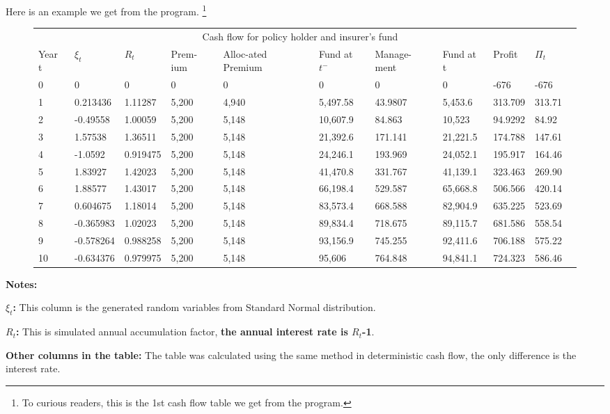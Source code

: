 \documentclass{report}
\begin{document}
Here is an example we get from the program. \footnote{To curious readers, this is the 1st cash flow table we get from the program.}


\begin{figure}[H]
\begin{tabular}{p{0.5cm} p{1.5cm} p{1.3cm} p{1cm} p{1.5cm} p{1.2cm} p{1.3cm} p{1.3cm}p{1.3cm}p{1.3cm}p{1.3cm} }
\toprule
\multicolumn{10}{c}{Cash flow for policy holder and insurer's fund} \\
\cmidrule(r){3-8}

Year t & $\xi_t$ &$R_t$ & Prem-ium & Alloc-ated Premium & Fund at $t^-$ &Manage-ment & Fund at t& Profit& $\Pi_t$ \\
\midrule
0&0&0&0&0&0&0&0&-676&-676\\
1&0.213436&1.11287&5,200&4,940&5,497.58&43.9807&5,453.6&313.709&313.71\\
2&-0.49558&1.00059&5,200&5,148&10,607.9&84.863&10,523&94.9292&84.92\\
3&1.57538&1.36511&5,200&5,148&21,392.6&171.141&21,221.5&174.788&147.61\\
4&-1.0592&\color{red}0.919475&5,200&5,148&\color{red}24,246.1&193.969&\color{red}24,052.1&195.917&164.46\\
5&1.83927&1.42023&5,200&5,148&41,470.8&331.767&41,139.1&323.463&269.90\\
6&1.88577&1.43017&5,200&5,148&66,198.4&529.587&65,668.8&506.566&420.14\\
7&0.604675&1.18014&5,200&5,148&83,573.4&668.588&82,904.9&635.225&523.69\\
8&-0.365983&1.02023&5,200&5,148&89,834.4&718.675&89,115.7&681.586&558.54\\
9&-0.578264&0.988258&5,200&5,148&93,156.9&745.255&92,411.6&706.188&575.22\\
10&-0.634376&0.979975&5,200&5,148&95,606&764.848&94,841.1&724.323&586.46\\

\bottomrule
\end{tabular}
\end{figure}

\textbf{Notes:}

\textbf{$\xi_t$:} This column is the generated random variables from Standard Normal distribution.

\textbf{$R_t$:} This is simulated annual accumulation factor, \textbf{the annual interest rate is $R_t$-1}.

\textbf{Other columns in the table:} The table was calculated using the same method in deterministic cash flow, the only difference is the interest rate.
\end{document}
